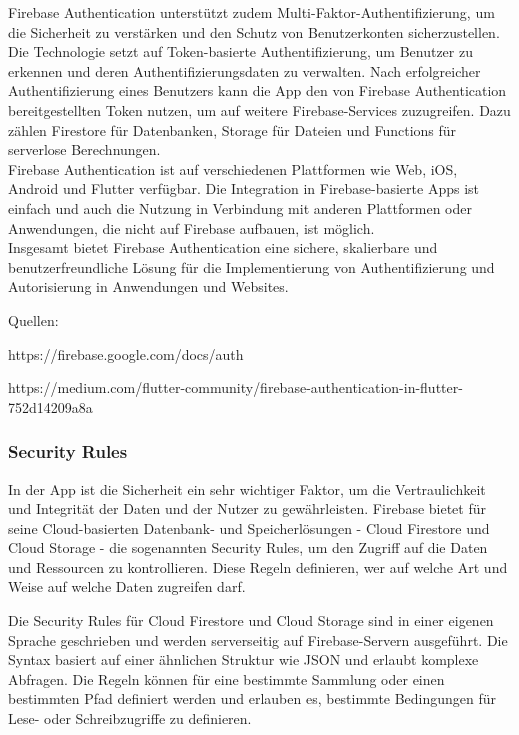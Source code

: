 Firebase Authentication unterstützt zudem Multi-Faktor-Authentifizierung, um die Sicherheit zu verstärken und den Schutz von Benutzerkonten sicherzustellen.
\\
Die Technologie setzt auf Token-basierte Authentifizierung, um Benutzer zu erkennen und deren Authentifizierungsdaten zu verwalten. Nach erfolgreicher Authentifizierung eines Benutzers kann die App den von Firebase Authentication bereitgestellten Token nutzen, um auf weitere Firebase-Services zuzugreifen. Dazu zählen Firestore für Datenbanken, Storage für Dateien und Functions für serverlose Berechnungen.
\\
Firebase Authentication ist auf verschiedenen Plattformen wie Web, iOS, Android und Flutter verfügbar. Die Integration in Firebase-basierte Apps ist einfach und auch die Nutzung in Verbindung mit anderen Plattformen oder Anwendungen, die nicht auf Firebase aufbauen, ist möglich.
\\
Insgesamt bietet Firebase Authentication eine sichere, skalierbare und benutzerfreundliche Lösung für die Implementierung von Authentifizierung und Autorisierung in Anwendungen und Websites.

Quellen:

https://firebase.google.com/docs/auth

https://medium.com/flutter-community/firebase-authentication-in-flutter-752d14209a8a

\subsubsection{Security Rules}\label{sec:security-rules}
In der App ist die Sicherheit ein sehr wichtiger Faktor,
um die Vertraulichkeit und Integrität der Daten und der
Nutzer zu gewährleisten. Firebase bietet für seine
Cloud-basierten Datenbank- und Speicherlösungen - Cloud
Firestore und Cloud Storage - die sogenannten Security
Rules\cite{firebase-rules-docs}\cite{firestore-rules-firestore-nochba}\cite{storage-rules-storage-nochba}, um den Zugriff auf
die Daten und Ressourcen zu kontrollieren. Diese Regeln
definieren, wer auf welche Art und Weise auf welche Daten
zugreifen darf.

Die Security Rules für Cloud Firestore und Cloud Storage sind in einer eigenen Sprache geschrieben und werden serverseitig auf Firebase-Servern ausgeführt. Die Syntax basiert auf einer ähnlichen Struktur wie JSON und erlaubt komplexe Abfragen. Die Regeln können für eine bestimmte Sammlung oder einen bestimmten Pfad definiert werden und erlauben es, bestimmte Bedingungen für Lese- oder Schreibzugriffe zu definieren.


